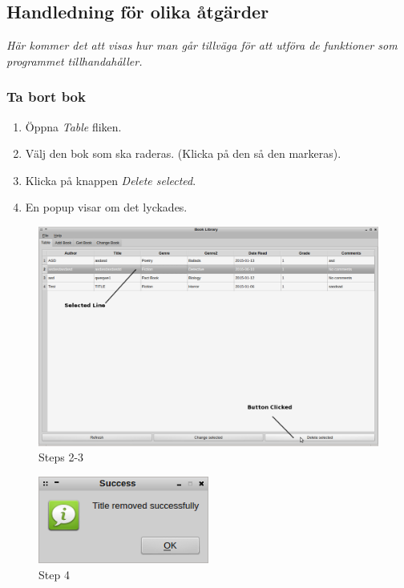 \documentclass[11pt, titlepage, oneside, a4paper]{article}
\newcommand{\Subsection}[1]{\vspace{-4pt}\subsection{#1}\vspace{-8pt}}
\newcommand{\Subsubsection}[1]{\vspace{-4pt}\subsubsection{#1}\vspace{-8pt}}
\begin{document}
        \Subsection{Handledning för olika åtgärder}
        \emph{Här kommer det att visas hur man går tillväga för att 
       utföra de funktioner som programmet tillhandahåller.}
        \Subsubsection{Ta bort bok}
        \begin{enumerate}
		\item Öppna \emph{Table} fliken.
        \item Välj den bok som ska raderas. (Klicka på den så den markeras).
        \item Klicka på knappen \emph{Delete selected}.
        \item En popup visar om det lyckades.
		\end{enumerate}
        
        \begin{figure}[h]
        \includegraphics[width=1\textwidth]{delete_book}
        \caption{Steps 2-3}
        \label{fig:delete}
        \end{figure}
        
        \begin{figure}[h!]
        \includegraphics[width=0.5\textwidth]{title_deleted}
        \caption{Step 4}
        \label{fig:title_deleted}
        \end{figure}
        
        \cleardoublepage
        
\end{document}
